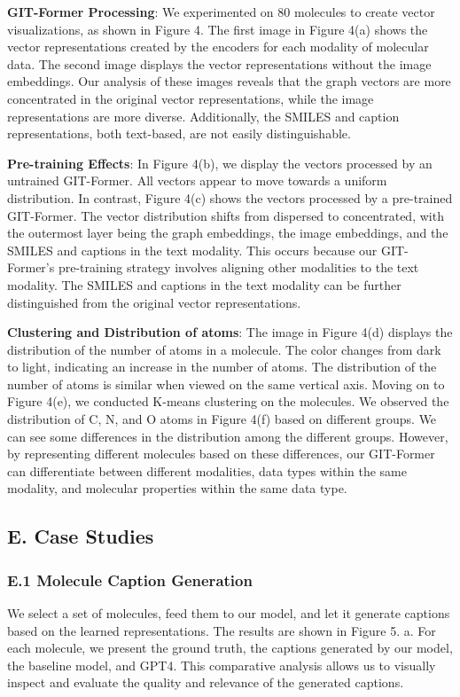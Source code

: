 \documentclass{article}
\begin{document}
\textbf{GIT-Former Processing}:  We experimented on 80 molecules to create vector visualizations, as shown in Figure 4. The first image in Figure 4(a) shows the vector representations created by the encoders for each modality of molecular data. The second image displays the vector representations without the image embeddings. Our analysis of these images reveals that the graph vectors are more concentrated in the original vector representations, while the image representations are more diverse. Additionally, the SMILES and caption representations, both text-based, are not easily distinguishable.
 
\textbf{Pre-training Effects}: In Figure 4(b), we display the vectors processed by an untrained GIT-Former. All vectors appear to move towards a uniform distribution. In contrast, Figure 4(c) shows the vectors processed by a pre-trained GIT-Former. The vector distribution shifts from dispersed to concentrated, with the outermost layer being the graph embeddings, the image embeddings, and the SMILES and captions in the text modality. This occurs because our GIT-Former's pre-training strategy involves aligning other modalities to the text modality. The SMILES and captions in the text modality can be further distinguished from the original vector representations.
 
\textbf{Clustering and Distribution of atoms}: The image in Figure 4(d) displays the distribution of the number of atoms in a molecule. The color changes from dark to light, indicating an increase in the number of atoms. The distribution of the number of atoms is similar when viewed on the same vertical axis. Moving on to Figure 4(e), we conducted K-means clustering on the molecules. We observed the distribution of C, N, and O atoms in Figure 4(f) based on different groups. We can see some differences in the distribution among the different groups. However, by representing different molecules based on these differences, our GIT-Former can differentiate between different modalities, data types within the same modality, and molecular properties within the same data type.

\subsection*{E. Case Studies}

\subsubsection*{E.1 Molecule Caption Generation}
We select a set of molecules, feed them to our model, and let it generate captions based on the learned representations. The results are shown in Figure 5. a. For each molecule, we present the ground truth, the captions generated by our model, the baseline model, and GPT4. This comparative analysis allows us to visually inspect and evaluate the quality and relevance of the generated captions. 
\end{document}

